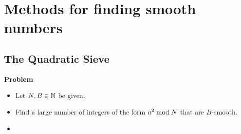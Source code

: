 
\section{Methods for finding smooth numbers}

\subsection{The Quadratic Sieve}

\begin{center}
	\begin{minipage}{0.70\textwidth}
		\begin{center}\textbf{Problem}\end{center}
		\begin{itemize}
		\item	\vskip -0.3cm Let $N,B \in \mathbb{N}$ be given.
		\item	Find a large number of integers of the form $a^{2}\;\textnormal{mod}\;N$ that are $B$-smooth.
		\end{itemize}
	\end{minipage}
\end{center}

\begin{itemize}
\item	
\end{itemize}